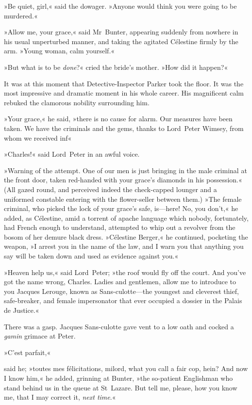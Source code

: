 »Be quiet, girl,« said the dowager. »Anyone would think you were going to be murdered.«

»Allow me, your grace,« said Mr~Bunter, appearing suddenly from nowhere in his usual unperturbed manner, and taking the agitated Célestine firmly by the arm. »Young woman, calm yourself.«

»But what is to be \textit{done}?« cried the bride's mother. »How did it happen?«

It was at this moment that Detective-Inspector Parker took the floor. It was the most impressive and dramatic moment in his whole career. His magnificent calm rebuked the clamorous nobility surrounding him.

»Your grace,« he said, »there is no cause for alarm. Our measures have been taken. We have the criminals and the gems, thanks to Lord~Peter Wimsey, from whom we received inf\longdash«

»Charles!« said Lord~Peter in an awful voice.

»Warning of the attempt. One of our men is just bringing in the male criminal at the front door, taken red-handed with your grace's diamonds in his possession.« (All gazed round, and perceived indeed the check-capped lounger and a uniformed constable entering with the flower-seller between them.) »The female criminal, who picked the lock of your grace's safe, is—here! No, you don't,« he added, as Célestine, amid a torrent of apache language which nobody, fortunately, had French enough to understand, attempted to whip out a revolver from the bosom of her demure black dress. »Célestine Berger,« he continued, pocketing the weapon, »I arrest you in the name of the law, and I warn you that anything you say will be taken down and used as evidence against you.«

»Heaven help us,« said Lord~Peter; »the roof would fly off the court. And you've got the name wrong, Charles. Ladies and gentlemen, allow me to introduce to you Jacques Lerouge, known as Sans-culotte—the youngest and cleverest thief, safe-breaker, and female impersonator that ever occupied a dossier in the Palais de Justice.«

There was a gasp. Jacques Sans-culotte gave vent to a low oath and cocked a \textit{gamin} grimace at Peter.

\begin{french}»C'est parfait,«\end{french} said he; »toutes mes félicitations, milord, what you call a fair cop, hein? And now I know him,« he added, grinning at Bunter, »the so-patient Englishman who stand behind us in the queue at St~Lazare. But tell me, please, how you know me, that I may correct it, \textit{next time}.«

